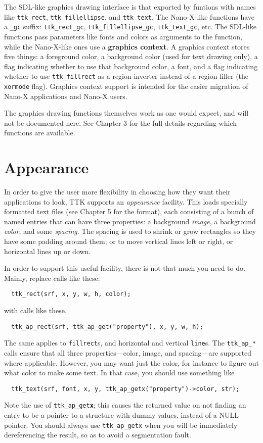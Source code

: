 \documentclass[12pt,letterpaper]{report}
\let\ttt\tt
\def\tt{\def\_{{\ttt\char`\_}}\ttt}
\def\texttt#1{{\tt #1}}
\begin{document}
The SDL-like graphics drawing interface is that exported by funtions with names like \verb|ttk_rect|,
\verb|ttk_fillellipse|, and \verb|ttk_text|. The Nano-X-like functions have a \verb|_gc| suffix:
\verb|ttk_rect_gc|, \verb|ttk_fillellipse_gc|, \verb|ttk_text_gc|, etc. The SDL-like functions
pass parameters like fonts and colors as arguments to the function, while the Nano-X-like ones
use a {\bf graphics context}. A graphics context stores five things: a foreground color, a background color
(used for text drawing only), a flag indicating whether to use that background color, a font,
and a flag indicating whether to use \verb|ttk_fillrect| as a region inverter instead of a region filler
(the \verb|xormode| flag). Graphics context support is intended for the easier migration of Nano-X
applications and Nano-X users.

The graphics drawing functions themselves work as one would expect, and will not be documented here.
See Chapter 3 for the full details regarding which functions are available.

\section{Appearance}
In order to give the user more flexibility in choosing how they want their applications to look,
TTK supports an {\sl appearance} facility. This loads specially formatted text files (see Chapter 5 for
the format), each consisting of a bunch of named entries that can have three properties: a background
{\sl image}, a background {\sl color}, and some {\sl spacing}. The spacing is used to shrink or
grow rectangles so they have some padding around them; or to move vertical lines left or right, or horizontal
lines up or down.

In order to support this useful facility, there is not that much you need to do.
Mainly, replace calls like these:
\begin{verbatim}
  ttk_rect(srf, x, y, w, h, color);
\end{verbatim}
with calls like these.
\begin{verbatim}
  ttk_ap_rect(srf, ttk_ap_get("property"), x, y, w, h);
\end{verbatim}
The same applies
to \verb|fillrect|s, and horizontal and vertical \verb|line|s. The \verb|ttk_ap_*| calls
ensure that all three properties---color, image, and spacing---are supported where applicable.
However, you may want just the color, for instance to figure out what color to make some text.
In that case, you should use something like
\begin{verbatim}
  ttk_text(srf, font, x, y, ttk_ap_getx("property")->color, str);
\end{verbatim}
Note the use of \verb|ttk_ap_get|\texttt{\textbf{x}}; this causes the returned
value on not finding an entry to be a pointer to a structure with dummy values, instead of
a NULL pointer. You should always use \verb|ttk_ap_getx| when you will be immediately
dereferencing the result, so as to avoid a segmentation fault.
\end{document}
